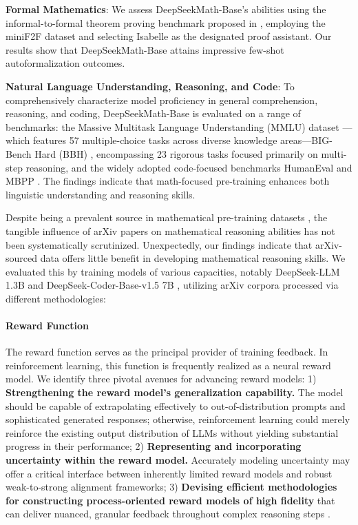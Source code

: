 \item \textbf{Formal Mathematics}: We assess DeepSeekMath-Base's abilities using the informal-to-formal theorem proving benchmark proposed in \citep{dsp_proof}, employing the miniF2F dataset \citep{minif2f} and selecting Isabelle \citep{isabelle} as the designated proof assistant. Our results show that DeepSeekMath-Base attains impressive few-shot autoformalization outcomes.
\item \textbf{Natural Language Understanding, Reasoning, and Code}: To comprehensively characterize model proficiency in general comprehension, reasoning, and coding, DeepSeekMath-Base is evaluated on a range of benchmarks: the Massive Multitask Language Understanding (MMLU) dataset \citep{mmlu}—which features 57 multiple-choice tasks across diverse knowledge areas—BIG-Bench Hard (BBH) \citep{bbh}, encompassing 23 rigorous tasks focused primarily on multi-step reasoning, and the widely adopted code-focused benchmarks HumanEval \citep{codex} and MBPP \citep{mbpp}. The findings indicate that math-focused pre-training enhances both linguistic understanding and reasoning skills.

Despite being a prevalent source in mathematical pre-training datasets \citep{minerva,gpt-f,llemma,mathpile}, the tangible influence of arXiv papers on mathematical reasoning abilities has not been systematically scrutinized. Unexpectedly, our findings indicate that arXiv-sourced data offers little benefit in developing mathematical reasoning skills. We evaluated this by training models of various capacities, notably DeepSeek-LLM 1.3B and DeepSeek-Coder-Base-v1.5 7B \citep{deepseek-coder}, utilizing arXiv corpora processed via different methodologies:

\paragraph{Reward Function} The reward function serves as the principal provider of training feedback. In reinforcement learning, this function is frequently realized as a neural reward model. We identify three pivotal avenues for advancing reward models: 1) \textbf{Strengthening the reward model’s generalization capability.} The model should be capable of extrapolating effectively to out-of-distribution prompts and sophisticated generated responses; otherwise, reinforcement learning could merely reinforce the existing output distribution of LLMs without yielding substantial progress in their performance; 2) \textbf{Representing and incorporating uncertainty within the reward model.} Accurately modeling uncertainty may offer a critical interface between inherently limited reward models and robust weak-to-strong alignment frameworks; 3) \textbf{Devising efficient methodologies for constructing process-oriented reward models of high fidelity} that can deliver nuanced, granular feedback throughout complex reasoning steps \citep{lightman2023let,wang2023math}.

